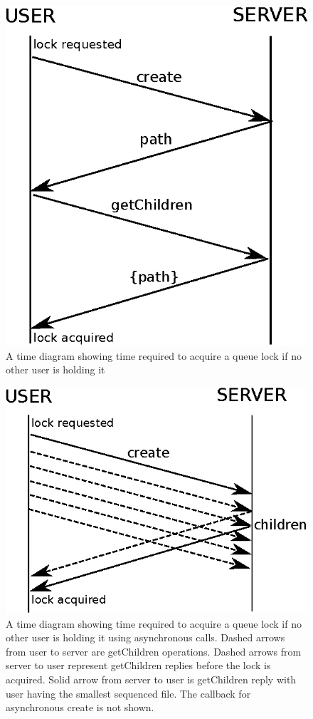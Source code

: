 \begin{figure}[ht]
\centering
\includegraphics[scale=0.85]{img/queue_lock_time.eps}
\caption{A time diagram showing time required to acquire a queue lock if no other user is holding it}
\label{fig:queue_lock_time}
\end{figure}

\begin{figure}[ht]
\centering
\includegraphics[scale=0.85]{img/async_queue_lock_time.eps}
\caption{A time diagram showing time required to acquire a queue lock if no other user is holding it using asynchronous calls. Dashed arrows from user to server are getChildren operations. Dashed arrows from server to user represent getChildren replies before the lock is acquired. Solid arrow from server to user is getChildren reply with user having the smallest sequenced file. The callback for asynchronous create is not shown.}
\label{fig:async_queue_lock_time}
\end{figure}

